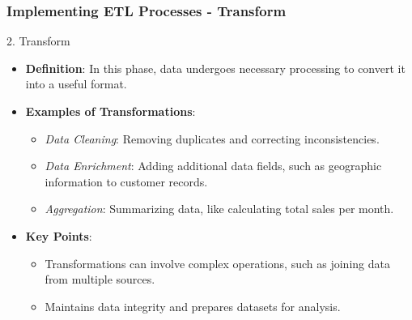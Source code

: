 \documentclass{beamer}
\begin{document}
\begin{frame}[fragile]
    \frametitle{Implementing ETL Processes - Transform}
    \begin{block}{2. Transform}
        \begin{itemize}
            \item \textbf{Definition}: In this phase, data undergoes necessary processing to convert it into a useful format.
            \item \textbf{Examples of Transformations}:
                \begin{itemize}
                    \item \textit{Data Cleaning}: Removing duplicates and correcting inconsistencies.
                    \item \textit{Data Enrichment}: Adding additional data fields, such as geographic information to customer records.
                    \item \textit{Aggregation}: Summarizing data, like calculating total sales per month.
                \end{itemize}
            \item \textbf{Key Points}:
                \begin{itemize}
                    \item Transformations can involve complex operations, such as joining data from multiple sources.
                    \item Maintains data integrity and prepares datasets for analysis.
                \end{itemize}
        \end{itemize}
    \end{block}
\end{frame}
\end{document}
